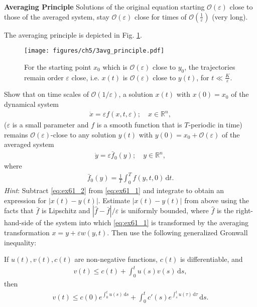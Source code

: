 \begin{framed}
	\noindent
	\textbf{Averaging Principle} Solutions of the original equation starting $\mathcal{O}(\varepsilon)$ close to those of the averaged system, stay $\mathcal{O}(\varepsilon)$ close for times of $\mathcal{O}\left(\frac{1}{\varepsilon}\right)$ (very long).
\end{framed}

The averaging principle is depicted in Fig. \ref{fig:avg_principle}.
\begin{figure}[h!]
	\centering
	\texttt{[image: figures/ch5/3avg\_principle.pdf]}
	\caption{For the starting point $x_0$ which is $\mathcal{O}(\varepsilon)$ close to $y_0$, the trajectories remain order $\varepsilon$ close, i.e. $x(t)$ is $\mathcal{O}(\varepsilon)$ close to $y(t)$, for $t \ll \frac{K}{\varepsilon}$.}
	\label{fig:avg_principle}
\end{figure}

\begin{exercise}
Show that on time scales of $\mathcal{O}(1/\varepsilon)$, a solution ${x}(t)$ with ${x}(0) = {x}_0$ of the dynamical system
\begin{align}
	\dot{{x}} = \varepsilon {f}({x},t, \varepsilon); \quad {x} \in \mathbb{R}^n, \label{eq:ex61_1}
\end{align}
($\varepsilon$ is a small parameter and ${f}$ is a smooth function that is $T$-periodic in time) remains $\mathcal{O}(\varepsilon)$-close to any solution ${y}(t)$ with ${y}(0) = {x}_0 + \mathcal{O}(\varepsilon)$ of the averaged system
\begin{align}
	\dot{{y}} = \varepsilon \bar{{f}}_0 ({y}); \quad {y} \in \mathbb{R}^n,\label{eq:ex61_2}
\end{align}
where
\begin{align}
	\bar{{f}}_0 ({y}) = \frac{1}{T} \int_0^T f(y,t,0) \, \text{d}t.
\end{align}
\textit{Hint}: Subtract \eqref{eq:ex61_2} from \eqref{eq:ex61_1} and integrate to obtain an expression for $|{x}(t) - {y}(t)|$. Estimate $|{x}(t) - {y}(t)|$ from above using the facts that $\bar{{f}}$ is Lipschitz and $|\hat{f} - \bar{f}|/\varepsilon$ is uniformly bounded, where $\hat{f}$ is the right-hand-side of the system into which \eqref{eq:ex61_1} is transformed by the averaging transformation ${x} = {y} + \varepsilon {w}({y},t)$. Then use the following generalized Gronwall inequality:

If $u(t), v(t), c(t)$ are non-negative functions, $c(t)$ is differentiable, and
\begin{align*}
	v(t) \leq c(t) + \int_0^t u(s)v(s) \, \text{d}s,
\end{align*}
then
\begin{align*}
	v(t) \leq c(0) e^{\int_0^t u(s)\, \text{d}s} + \int_0^t c'(s)e^{\int_s^t u(\tau)\,\text{d}\tau}\, \text{d}s.
\end{align*}

	
\end{exercise}


